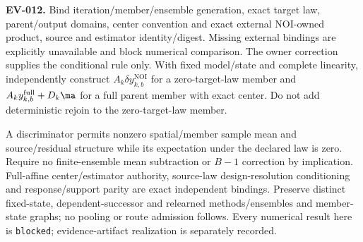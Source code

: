 {\textbf{EV-012.} Bind iteration/member/ensemble generation, exact target law,
parent/output domains, center convention and exact external NOI-owned product,
source and estimator identity/digest. Missing external bindings are explicitly
unavailable and block numerical comparison. The owner correction supplies the
conditional rule only. With fixed model/state and complete linearity, independently
construct $A_k\delta y_{k,b}^{\mathrm{NOI}}$ for a zero-target-law member and
$A_k y_{k,b}^{\mathrm{full}}+D_k\ma$ for a full parent member with exact center.
Do not add deterministic rejoin to the zero-target-law member.

A discriminator permits nonzero spatial/member sample mean and source/residual
structure while its expectation under the declared law is zero. Require no
finite-ensemble mean subtraction or $B-1$ correction by implication. Full-affine
center/estimator authority, source-law design-resolution conditioning and
response/support parity are exact independent bindings. Preserve distinct
fixed-state, dependent-successor and relearned methods/ensembles and member-state
graphs; no pooling or route admission follows. Every numerical result here is
\texttt{blocked}; evidence-artifact realization is separately recorded.
}
